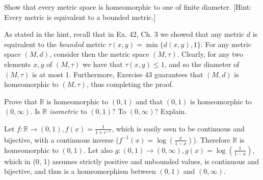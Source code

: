 \begin{exercise}{46}
    Show that every metric space is homeomorphic to one of finite diameter.
    [Hint: Every metric is equivalent to a bounded metric.]
\end{exercise}

\begin{solution}
    
    As stated in the hint, recall that in Ex. 42, Ch. 3 we showed that any metric $d$ is equivalent to the \textit{bounded} metric $\tau(x, y) = \min\{d(x, y), 1\}$.
    For any metric space $(M, d)$, consider then the metric space $(M, \tau)$.
    Clearly, for any two elements $x, y$ of $(M, \tau)$ we have that $\tau(x, y) \leq 1$, and so the diameter of $(M, \tau)$ is at most 1.
    Furthermore, Exercise 43 guarantees that $(M, d)$ is homeomorphic to $(M, \tau)$, thus completing the proof.
\end{solution}

\begin{exercise}{48}
    Prove that $\mathbb{R}$ is homeomorphic to $(0, 1)$ and that $(0, 1)$ is homeomorphic to $(0, \infty)$.
    Is $\mathbb{R}$ \textit{isometric} to $(0, 1)$?
    To $(0, \infty)$?
    Explain.
\end{exercise}

\begin{solution}
    
    Let $f: \mathbb{R} \rightarrow (0, 1), f(x) = \frac{1}{1 + e^{-x}}$, which is easily seen to be continuous and bijective, with a continuous inverse ($f^{-1}(x) = \log(\frac{x}{1 - x})$).
    Therefore $\mathbb{R}$ is homeomorphic to $(0, 1)$.
    Let also $g: (0, 1) \rightarrow (0, \infty), g(x) = \log(\frac{1}{1- x})$, which in (0, 1) assumes strictly positive and unbounded values, is continuous and bijective, and thus is a homeomorphism between $(0, 1)$ and $(0, \infty)$.
\end{solution}